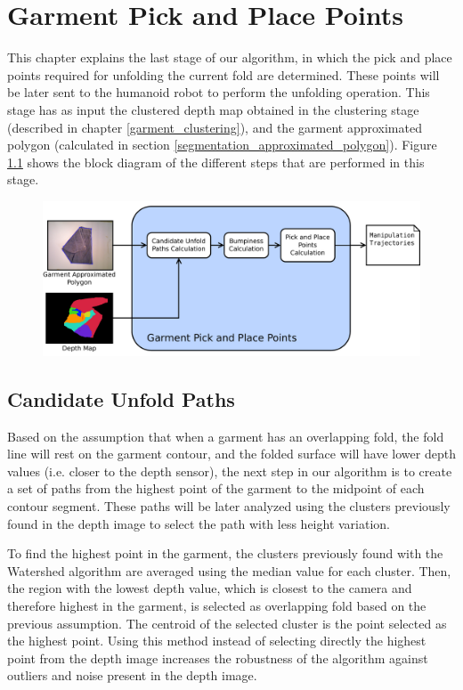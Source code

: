 \chapter{Garment Pick and Place Points}
\label{pick_and_place}
This chapter explains the last stage of our algorithm, in which the pick and place points required for unfolding the current fold are determined. These points will be later sent to the humanoid robot to perform the unfolding operation. This stage has as input the clustered depth map obtained in the clustering stage (described in chapter \ref{garment_clustering}), and the garment approximated polygon (calculated in section \ref{segmentation_approximated_polygon}). Figure \ref{fig:garment_pnp_points_blocks} shows the block diagram of the different steps that are performed in this stage.

\begin{figure}[thpb]
    \centering
    \includegraphics[width=\textwidth]
    {figures/Garment-pnp-points-diagram.pdf}
    \caption{}
    \label{fig:garment_pnp_points_blocks}
\end{figure}

\section{Candidate Unfold Paths}
\label{unfold_paths}

Based on the assumption that when a garment has an overlapping fold, the fold line will rest on the garment contour, and the folded surface will have lower depth values (i.e. closer to the depth sensor), the next step in our algorithm is to create a set of paths from the highest point of the garment to the midpoint of each contour segment. These paths will be later analyzed using the clusters previously found in the depth image to select the path with less height variation.

To find the highest point in the garment, the clusters previously found with the Watershed algorithm are averaged using the median value for each cluster. Then, the region with the lowest depth value, which is closest to the camera and therefore highest in the garment, is selected as overlapping fold based on the previous assumption. The centroid of the selected cluster is the point selected as the highest point. Using this method instead of selecting directly the highest point from the depth image increases the robustness of the algorithm against outliers and noise present in the depth image.

